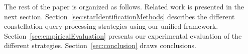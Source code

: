 

The rest of the paper is organized as follows. Related work is presented in the
next section. Section~\ref{sec:starIdentificationMethods} describes the different
constellation query processing strategies using our unified framework.
Section~\ref{sec:empiricalEvaluation} presents our experimental evaluation of
the different strategies. Section~\ref{sec:conclusion} draws conclusions.
